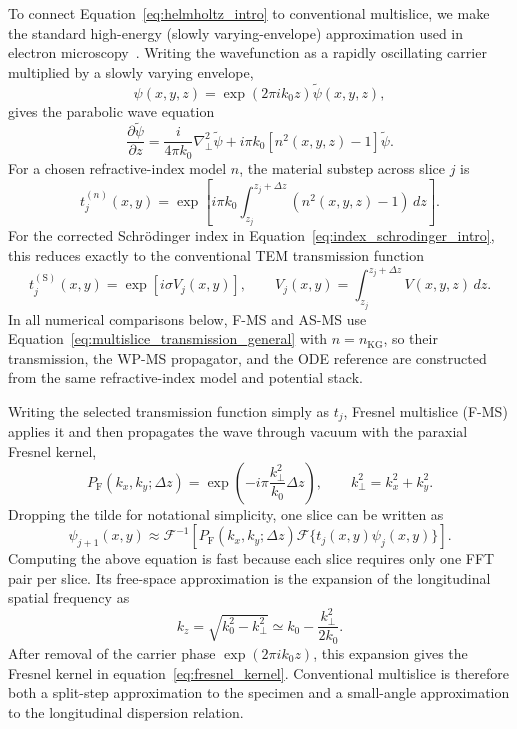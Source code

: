 \documentclass[preprint,12pt,number]{elsarticle}
\begin{document}
To connect Equation~\eqref{eq:helmholtz_intro} to conventional multislice, we
make the standard high-energy (slowly varying-envelope) approximation used in
electron microscopy~\cite{kirkland2010advanced}. Writing the wavefunction as a
rapidly oscillating carrier multiplied by a slowly varying envelope,
\begin{equation}
\psi(x,y,z)=\exp(2\pi i k_0z)\tilde\psi(x,y,z),
\label{eq:carrier_envelope}
\end{equation}
gives the parabolic wave equation
\begin{equation}
\label{eq:paraxial_helmholtz_intro}
\frac{\partial\tilde\psi}{\partial z}
=
\frac{i}{4\pi k_0}\nabla_\perp^2\tilde\psi
+
i\pi k_0\left[n^2(x,y,z)-1\right]\tilde\psi.
\end{equation}
For a chosen refractive-index model $n$, the material substep across slice
$j$ is
\begin{equation}
t_j^{(n)}(x,y)
=
\exp\left[
i\pi k_0
\int_{z_j}^{z_j+\Delta z}
\left(n^2(x,y,z)-1\right)\,dz
\right].
\label{eq:multislice_transmission_general}
\end{equation}
For the corrected Schr\"odinger index in
Equation~\eqref{eq:index_schrodinger_intro}, this reduces exactly to the
conventional TEM transmission function
\begin{equation}
t_j^{(\mathrm{S})}(x,y)
=
\exp\left[i\sigma V_j(x,y)\right],
\qquad
V_j(x,y)
=
\int_{z_j}^{z_j+\Delta z}V(x,y,z)\,dz.
\label{eq:multislice_transmission}
\end{equation}
In all numerical comparisons below, F-MS and AS-MS use
Equation~\eqref{eq:multislice_transmission_general} with
$n=n_\mathrm{KG}$, so their transmission, the WP-MS propagator, and the ODE
reference are constructed from the same refractive-index model and potential
stack.

Writing the selected transmission function simply as $t_j$, Fresnel multislice
(F-MS) applies it and then
propagates the wave through vacuum with the paraxial Fresnel kernel,
\begin{equation}
\label{eq:fresnel_kernel}
P_\mathrm{F}(k_x,k_y;\Delta z)
=
\exp\left(-i\pi\frac{k_\perp^2}{k_0}\Delta z\right),
\qquad
k_\perp^2=k_x^2+k_y^2.
\end{equation}
Dropping the tilde for notational simplicity, one slice can be written as
\begin{equation}
\label{eq:fresnel_step}
\psi_{j+1}(x,y)
\approx
\mathcal F^{-1}
\left[
P_\mathrm{F}(k_x,k_y;\Delta z)
\mathcal F\{t_j(x,y)\psi_j(x,y)\}
\right].
\end{equation}
Computing the above equation is fast because each slice requires only one FFT pair per slice. Its free-space approximation
is the expansion of the longitudinal spatial frequency as
\[
k_z
=
\sqrt{k_0^2-k_\perp^2}
\simeq
k_0-\frac{k_\perp^2}{2k_0}.
\]
After removal of the carrier phase $\exp(2\pi i k_0z)$, this expansion gives the
Fresnel kernel in equation~\eqref{eq:fresnel_kernel}. Conventional multislice is
therefore both a split-step approximation to the specimen and a small-angle
approximation to the longitudinal dispersion relation.
\end{document}
